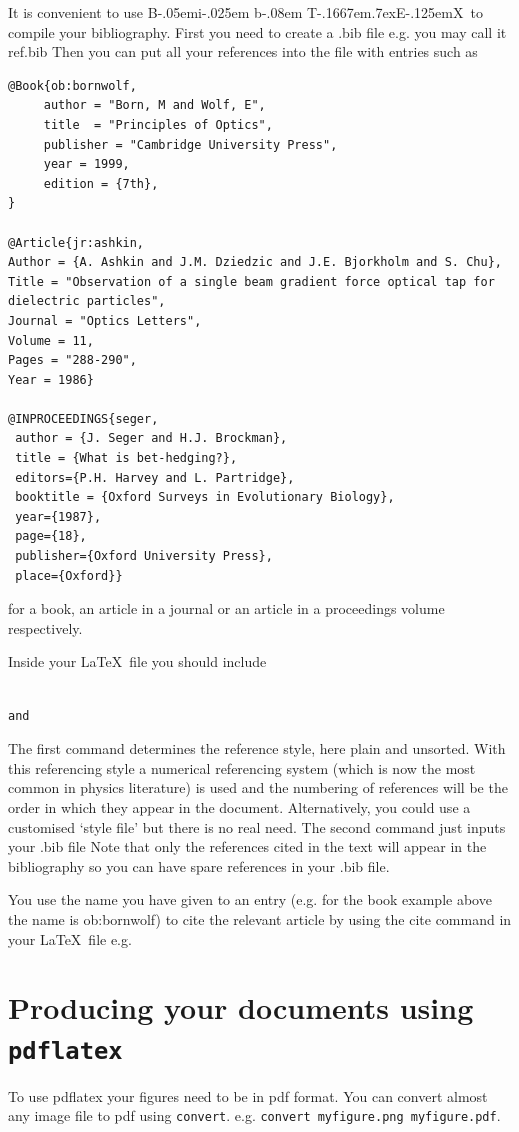 \documentclass[12pt,a4paper]{report}
\def\BibTeX{{\rm B\kern-.05em{\sc i\kern-.025em b}\kern-.08em
    T\kern-.1667em\lower.7ex\hbox{E}\kern-.125emX}}
\begin{document}
It is convenient to use \BibTeX\ to compile your bibliography.  First
you need to create a .bib file e.g.  you may call it ref.bib Then you
can put all your references into the file with entries such as
\begin{verbatim}
@Book{ob:bornwolf,
     author = "Born, M and Wolf, E",
     title  = "Principles of Optics",
     publisher = "Cambridge University Press",
     year = 1999,
     edition = {7th},
}

@Article{jr:ashkin,
Author = {A. Ashkin and J.M. Dziedzic and J.E. Bjorkholm and S. Chu},
Title = "Observation of a single beam gradient force optical tap for 
dielectric particles",
Journal = "Optics Letters",
Volume = 11,
Pages = "288-290",
Year = 1986}

@INPROCEEDINGS{seger,
 author = {J. Seger and H.J. Brockman},
 title = {What is bet-hedging?},
 editors={P.H. Harvey and L. Partridge},
 booktitle = {Oxford Surveys in Evolutionary Biology},
 year={1987},
 page={18},
 publisher={Oxford University Press},
 place={Oxford}}
\end{verbatim}
for a book, an article in a journal or an article in a proceedings volume
respectively.

Inside your \LaTeX\ file
you should include 
\begin{verbatim}
                      
and

\end{verbatim}
The first command determines the reference style, here plain and 
unsorted. With this referencing style 
a numerical referencing system (which is now the most
common in physics literature) is used and the numbering of references
will be the order in which they appear in the document. Alternatively, 
you could use
a customised `style file' but there is no real need.  The second
command just inputs your .bib file Note that only the references cited
in the text will appear in the bibliography so you can have spare
references in your .bib file.


You use the name you have given to an entry (e.g.
for the book example above the name is ob:bornwolf)
to cite the relevant article
by using the cite command in your \LaTeX\ file e.g. \cite{ob:bornwolf}



\section{Producing your documents using \texttt{pdflatex}}

To use pdflatex your figures need to be in pdf format.  You can convert almost any image file to pdf using \texttt{convert}.  e.g. \texttt{convert myfigure.png myfigure.pdf}.
\end{document}
